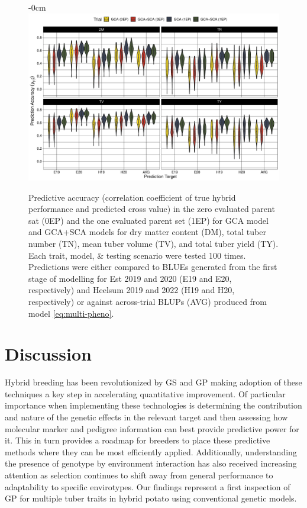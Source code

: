 \begin{figure}[H]
\begin{adjustwidth}{-\extralength}{0cm}
\centering
\includegraphics[width=15.5cm]{figs_03/fig-pa-1.pdf}
\end{adjustwidth}
\caption{\label{fig:pa}Predictive accuracy (correlation coefficient of true hybrid performance and predicted cross value) in the zero evaluated parent sat (0EP) and the one evaluated parent set (1EP) for GCA model and GCA+SCA models for dry matter content (DM), total tuber number (TN), mean tuber volume (TV), and total tuber yield (TY). Each trait, model, \& testing scenario were tested 100 times. Predictions were either compared to BLUEs generated from the first stage of modelling for Est 2019 and 2020 (E19 and E20, respectively) and Heelsum 2019 and 2022 (H19 and H20, respectively) or against across-trial BLUPs (AVG) produced from model \eqref{eq:multi-pheno}.}
\end{figure}


\section{Discussion}

Hybrid breeding has been revolutionized by GS and GP making adoption of these techniques a key step in accelerating quantitative improvement. Of particular importance when implementing these technologies is determining the contribution and nature of the genetic effects in the relevant target and then assessing how molecular marker and pedigree information can best provide predictive power for it. This in turn provides a roadmap for breeders to place these predictive methods where they can be most efficiently applied. Additionally, understanding the presence of genotype by environment interaction has also received increasing attention as selection continues to shift away from general performance to adaptability to specific envirotypes. Our findings represent a first inspection of GP for multiple tuber traits in hybrid potato using conventional genetic models.

